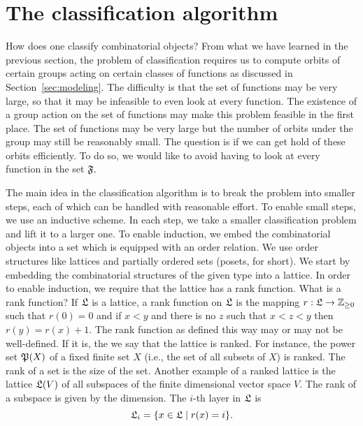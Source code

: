 \section{The classification algorithm}
\label{sec:algorithm}

How does one classify combinatorial objects?
From what we have learned in the previous section, the problem of classification requires us to compute orbits 
of certain groups acting on certain classes of functions as discussed in Section~\ref{sec:modeling}. 
The difficulty is that the set of functions may be very large, so that 
it may be infeasible to even look at every function. 
The existence of a group action on the set of functions may make this problem feasible in the first place. 
The set of functions may be very large but the number of orbits under the group may still be 
reasonably small. The question is if we can get hold of these orbits efficiently. 
To do so, we would like to avoid having to look at every function in the set ${\mathfrak F}.$


\bigskip


The main idea in the classification algorithm 
is to break the problem into smaller steps, each of which can be handled 
with reasonable effort. 
To enable small steps, we use an inductive scheme. In each step, we 
take a smaller classification problem and lift it to a larger one.
To enable induction, we embed the combinatorial objects into a set which is equipped with an order relation.
We use order structures 
like lattices and partially ordered sets (posets, for short). 
We start by embedding the combinatorial 
structures of the given type into a lattice.
In order to enable induction, we require that the lattice has a rank function.
What is a rank function?
If ${\mathfrak L}$ is a lattice, a rank function on ${\mathfrak L}$ 
is the mapping 
$r: {\mathfrak L} \rightarrow {\mathbb Z}_{\ge 0}$ such that $r(0) = 0$ and 
if $x <y$ and there is no $z$ such that $x < z < y$ then 
$r(y) = r(x) +1.$ 
The rank function as defined this way may or may not be well-defined. 
If it is, the we say that the lattice is ranked.
For instance, the power set ${\mathfrak P}(X)$ of a fixed finite set $X$ (i.e., the set of all subsets of $X$) 
is ranked. The rank of a set is the size of the set.
Another example of a ranked lattice is the lattice ${\mathfrak L}(V)$ of all subspaces of the finite dimensional 
vector space $V$. The rank of a subspace is given by the dimension.
The $i$-th layer in ${\mathfrak L}$ is 
$$
{\mathfrak L}_i = \{ x \in {\mathfrak L} \mid r(x) = i \}.
$$

\bigskip

